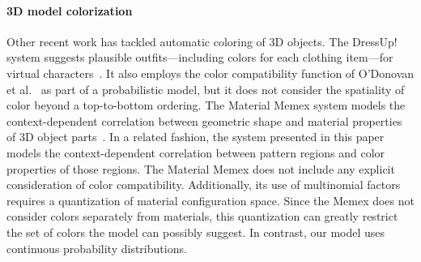 \paragraph{3D model colorization}
Other recent work has tackled automatic coloring of 3D objects. The DressUp! system suggests plausible outfits---including colors for each clothing item---for virtual characters~\cite{DressUp}. It also employs the color compatibility function of O'Donovan et al.~ as part of a probabilistic model, but it does not consider the spatiality of color beyond a top-to-bottom ordering. The Material Memex system models the context-dependent correlation between geometric shape and material properties of 3D object parts~\cite{MaterialMemex}. In a related fashion, the system presented in this paper models the context-dependent correlation between pattern regions and color properties of those regions. The Material Memex does not include any explicit consideration of color compatibility. Additionally, its use of multinomial factors requires a quantization of material configuration space. Since the Memex does not consider colors separately from materials, this quantization can greatly restrict the set of colors the model can possibly suggest. In contrast, our model uses continuous probability distributions.

